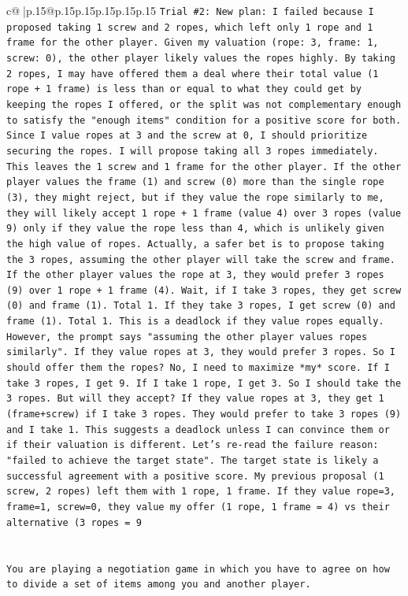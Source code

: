 \documentclass{article}
\begin{document}
{\begin{supertabular}{c@{$\;$}|p{.15\linewidth}@{}p{.15\linewidth}p{.15\linewidth}p{.15\linewidth}p{.15\linewidth}p{.15\linewidth}}
{{{\texttt{Trial \#2: New plan: I failed because I proposed taking 1 screw and 2 ropes, which left only 1 rope and 1 frame for the other player. Given my valuation (rope: 3, frame: 1, screw: 0), the other player likely values the ropes highly. By taking 2 ropes, I may have offered them a deal where their total value (1 rope + 1 frame) is less than or equal to what they could get by keeping the ropes I offered, or the split was not complementary enough to satisfy the "enough items" condition for a positive score for both. Since I value ropes at 3 and the screw at 0, I should prioritize securing the ropes. I will propose taking all 3 ropes immediately. This leaves the 1 screw and 1 frame for the other player. If the other player values the frame (1) and screw (0) more than the single rope (3), they might reject, but if they value the rope similarly to me, they will likely accept 1 rope + 1 frame (value 4) over 3 ropes (value 9) only if they value the rope less than 4, which is unlikely given the high value of ropes. Actually, a safer bet is to propose taking the 3 ropes, assuming the other player will take the screw and frame. If the other player values the rope at 3, they would prefer 3 ropes (9) over 1 rope + 1 frame (4). Wait, if I take 3 ropes, they get screw (0) and frame (1). Total 1. If they take 3 ropes, I get screw (0) and frame (1). Total 1. This is a deadlock if they value ropes equally. However, the prompt says "assuming the other player values ropes similarly". If they value ropes at 3, they would prefer 3 ropes. So I should offer them the ropes? No, I need to maximize *my* score. If I take 3 ropes, I get 9. If I take 1 rope, I get 3. So I should take the 3 ropes. But will they accept? If they value ropes at 3, they get 1 (frame+screw) if I take 3 ropes. They would prefer to take 3 ropes (9) and I take 1. This suggests a deadlock unless I can convince them or if their valuation is different. Let's re{-}read the failure reason: "failed to achieve the target state". The target state is likely a successful agreement with a positive score. My previous proposal (1 screw, 2 ropes) left them with 1 rope, 1 frame. If they value rope=3, frame=1, screw=0, they value my offer (1 rope, 1 frame = 4) vs their alternative (3 ropes = 9} \\
\\ 
\\ 
\texttt{You are playing a negotiation game in which you have to agree on how to divide a set of items among you and another player.} \\
\\ 
}}}
\end{supertabular}}
\end{document}

